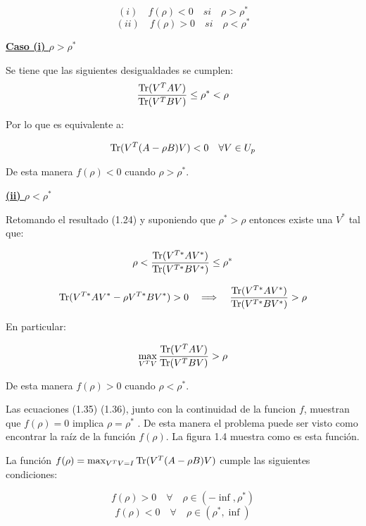 \begin{equation}\label{eq:2.36}
	(i) \quad f(\rho) < 0 \quad si \quad \rho>\rho^*
\end{equation}
\begin{equation}\label{eq:2.37}
	(ii) \quad f(\rho) > 0 \quad si \quad \rho<\rho^*
\end{equation}

\underline{\textbf{Caso (i) $\rho > \rho^* $}}

Se tiene que las siguientes desigualdades se cumplen:
\begin{equation*}
\frac{\operatorname{Tr}(V^T A V)}{\operatorname{Tr}(V^T B V)} \leq \rho^* < \rho	
\end{equation*}

Por lo que es equivalente a:

\begin{equation*}
	\operatorname{Tr}(V^T (A -\rho B)V) < 0 \quad \forall V \in U_p
\end{equation*}


De esta manera $f(\rho) < 0$ cuando $\rho > \rho^*$.
\vspace{5mm}

\underline{\textbf{(ii) $\rho < \rho^* $}}

Retomando el resultado (1.24) y suponiendo que $\rho^* > \rho$ entonces existe una $V^{*}$ tal que:


 \begin{equation*} 
 \rho < \frac{\operatorname{Tr}(V^{T*} A V^*)}{\operatorname{Tr}(V^{T*} B V^*)} \leq \rho^*
 \end{equation*}

\begin{equation*}
\operatorname{Tr}(V^{T*} A V^* - \rho V^{T*} B V^*) > 0 \quad \Longrightarrow \quad \frac{\operatorname{Tr}(V^{T*} A V^*)}{\operatorname{Tr}(V^{T*} B V^{*})} > \rho
\end{equation*}

En particular:

\begin{equation*}
\max_{V^TV} \frac{\operatorname{Tr}(V^{T} A V)}{\operatorname{Tr}(V^{T} B V)} > \rho
\end{equation*}

De esta manera $f(\rho) > 0$ cuando $\rho < \rho^*$.


Las ecuaciones (1.35) (1.36), junto con la continuidad de la funcion $f$, muestran que $f(\rho) = 0$ implica $\rho = \rho^*$ \cite{ngo2012trace}. De esta manera el problema puede ser visto como encontrar la raíz de la función $f(\rho)$. La figura 1.4 muestra como es esta función.

\begin{corollary}
La función $f(\rho) = \max_{V^TV = I} \operatorname{Tr}(V^T (A -\rho B)V)$ cumple las siguientes condiciones:

$$f(\rho) > 0  \quad \forall \quad \rho \in (-\inf, \rho^*)$$
$$f(\rho) < 0  \quad \forall \quad \rho \in (\rho^*, \inf)$$

\end{corollary}

